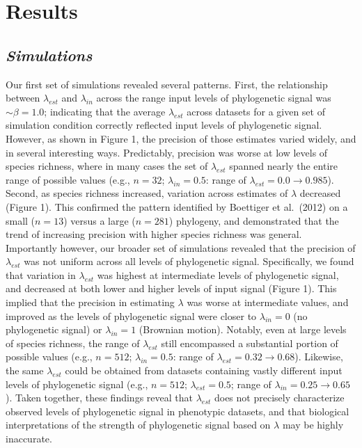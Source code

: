 \documentclass[
]{article}
\begin{document}
\hypertarget{results}{%
\section{Results}\label{results}}

\hypertarget{simulations-1}{%
\subsection{\texorpdfstring{\emph{Simulations}}{Simulations}}\label{simulations-1}}

Our first set of simulations revealed several patterns. First, the
relationship between \(\lambda_{est}\) and \(\lambda_{in}\) across the
range input levels of phylogenetic signal was \(\sim\beta=1.0\);
indicating that the average \(\lambda_{est}\) across datasets for a
given set of simulation condition correctly reflected input levels of
phylogenetic signal. However, as shown in Figure 1, the precision of
those estimates varied widely, and in several interesting ways.
Predictably, precision was worse at low levels of species richness,
where in many cases the set of \(\lambda_{est}\) spanned nearly the
entire range of possible values (e.g., \(n=32\); \(\lambda_{in}=0.5\):
range of \(\lambda_{est}= 0.0\to 0.985\)). Second, as species richness
increased, variation across estimates of \(\lambda\) decreased (Figure
1). This confirmed the pattern identified by Boettiger et al.~(2012) on
a small (\(n=13\)) versus a large (\(n=281\)) phylogeny, and
demonstrated that the trend of increasing precision with higher species
richness was general. Importantly however, our broader set of
simulations revealed that the precision of \(\lambda_{est}\) was not
uniform across all levels of phylogenetic signal. Specifically, we found
that variation in \(\lambda_{est}\) was highest at intermediate levels
of phylogenetic signal, and decreased at both lower and higher levels of
input signal (Figure 1). This implied that the precision in estimating
\(\lambda\) was worse at intermediate values, and improved as the levels
of phylogenetic signal were closer to \(\lambda_{in}=0\) (no
phylogenetic signal) or \(\lambda_{in}=1\) (Brownian motion). Notably,
even at large levels of species richness, the range of \(\lambda_{est}\)
still encompassed a substantial portion of possible values (e.g.,
\(n=512\); \(\lambda_{in}=0.5\): range of
\(\lambda_{est} = 0.32\to 0.68\)). Likewise, the same \(\lambda_{est}\)
could be obtained from datasets containing vastly different input levels
of phylogenetic signal (e.g., \(n=512\); \(\lambda_{est} = 0.5\); range
of \(\lambda_{in} = 0.25 \to 0.65\)). Taken together, these findings
reveal that \(\lambda_{est}\) does not precisely characterize observed
levels of phylogenetic signal in phenotypic datasets, and that
biological interpretations of the strength of phylogenetic signal based
on \(\lambda\) may be highly inaccurate. \hfill\break
\end{document}
